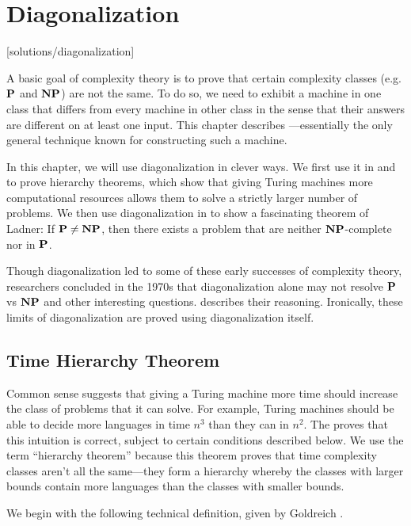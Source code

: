 \chapter{Diagonalization}
[solutions/diagonalization]

A basic goal of complexity theory is to prove that certain complexity classes (e.g. $\textbf{P}$ and $\textbf{NP}$) are not the same. To do so, we need to exhibit a machine in one class that differs from every machine in other class in the sense that their answers are different on at least one input. This chapter describes —essentially the only general technique known for constructing such a machine.

In this chapter, we will use diagonalization in clever ways. We first use it in  and  to prove hierarchy theorems, which show that giving Turing machines more computational resources allows them to solve a strictly larger number of problems. We then use diagonalization in  to show a fascinating theorem of Ladner: If $\textbf{P} \neq \textbf{NP}$, then there exists a problem that are neither $\textbf{NP}$-complete nor in $\textbf{P}$.

Though diagonalization led to some of these early successes of complexity theory, researchers concluded in the 1970s that diagonalization alone may not resolve $\textbf{P}$ vs $\textbf{NP}$ and other interesting questions.  describes their reasoning. Ironically, these limits of diagonalization are proved using diagonalization itself.

\section{Time Hierarchy Theorem}
Common sense suggests that giving a Turing machine more time should increase the class of problems that it can solve. For example, Turing machines should be able to decide more languages in time $n^3$ than they can in $n^2$. The  proves that this intuition is correct, subject to certain conditions described below. We use the term ``hierarchy theorem'' because this theorem proves that time complexity classes aren't all the same—they form a hierarchy whereby the classes with larger bounds contain more languages than the classes with smaller bounds.

We begin with the following technical definition, given by Goldreich \cite{goldreich2008computational}.


